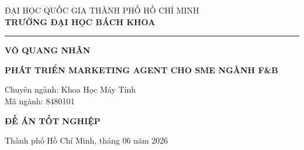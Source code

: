 \thispagestyle{empty}

\begin{center}
    \fontsize{12}{14.5}\selectfont ĐẠI HỌC QUỐC GIA THÀNH PHỐ HỒ CHÍ MINH\\[0.15cm]
    \fontsize{13}{15.5}\selectfont\textbf{TRƯỜNG ĐẠI HỌC BÁCH KHOA}

    \vspace{0.3cm}
    \rule{4.5cm}{0.4pt}

    \vspace{2.5cm}
    \fontsize{16}{19}\selectfont\textbf{VÕ QUANG NHÂN}

    \vspace{2.5cm}
    \begin{minipage}{0.8\linewidth}
        \centering
        \fontsize{20}{25}\selectfont{}\baselineskip\relax
        \textbf{PHÁT TRIỂN MARKETING AGENT CHO SME NGÀNH F\&B}
    \end{minipage}

    \vspace{2.5cm}
\end{center}

\begin{center}
\begin{minipage}{0.55\linewidth}
    \fontsize{16}{19}\selectfont
    Chuyên ngành: Khoa Học Máy Tính\\
    Mã ngành: 8480101
\end{minipage}
\end{center}

\vfill

\begin{center}
    \fontsize{20}{24}\selectfont\textbf{ĐỀ ÁN TỐT NGHIỆP}
\end{center}

\vfill

\begin{center}
    \fontsize{13}{15.5}\selectfont Thành phố Hồ Chí Minh, tháng 06 năm 2026
\end{center}

\clearpage
